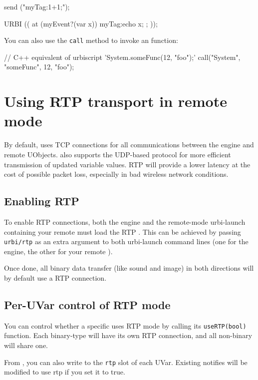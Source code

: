 \begin{urbiunchecked}
send ("myTag:1+1;");

URBI (( at (myEvent?(var x)) { myTag:echo x; }; ));
\end{urbiunchecked}

You can also use the \lstinline{call} method to invoke an \us function:

\begin{urbiunchecked}
// C++ equivalent of urbiscript 'System.someFunc(12, "foo");'
call("System", "someFunc", 12, "foo");
\end{urbiunchecked}

\section{Using RTP transport in remote mode}
\label{sec:uob:api:rtp}

By default, \urbi uses TCP connections for all communications between the
engine and remote UObjects. \urbi also supports the UDP-based 
protocol for more efficient transmission of updated variable values. RTP
will provide a lower latency at the cost of possible packet loss, especially
in bad wireless network conditions.

\subsection{Enabling RTP}

To enable RTP connections, both the engine and the remote-mode urbi-launch
containing your remote \UObject must load the RTP \UObject. This can be
achieved by passing \lstinline|urbi/rtp| as an extra argument to both
urbi-launch command lines (one for the engine, the other for your remote
\UObject).

Once done, all binary data transfer (like sound and image) in both
directions will by default use a RTP connection.

\subsection{Per-UVar control of RTP mode}

You can control whether a specific \UVar uses RTP mode by calling its
\lstinline|useRTP(bool)| function. Each binary-type \UVar will have its own
RTP connection, and all non-binary \UVar will share one.

From \us, you can also write to the \lstinline|rtp| slot of each UVar. Existing
notifies will be modified to use rtp if you set it to true.


